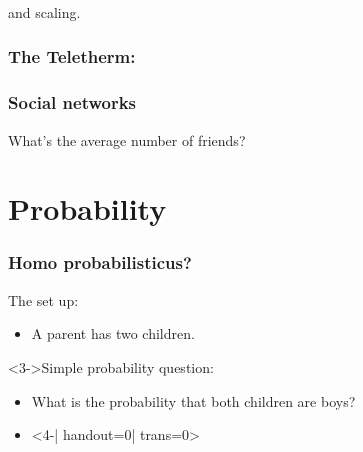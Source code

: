 \begin{frame}
  \frametitle{}
  
  and scaling.

  \cite{hill2008a}


\end{frame}

\begin{frame}
  \frametitle{The Teletherm:}
  


\end{frame}


\begin{frame}
  \frametitle{Social networks}

  What's the average number of friends?

\end{frame}

\section{Probability}

\begin{frame}
\frametitle{Homo probabilisticus?}

\begin{block}{The set up:}
  \begin{itemize}
  \item<2->
    A parent has two children.
  \end{itemize}
\end{block}

\begin{block}<3->{Simple probability question:}
  
  \begin{itemize}
  \item<3->
    What is the probability that both
    children are boys?
  \item<4-| handout=0| trans=0>
  \end{itemize}
\end{block}

\end{frame}


